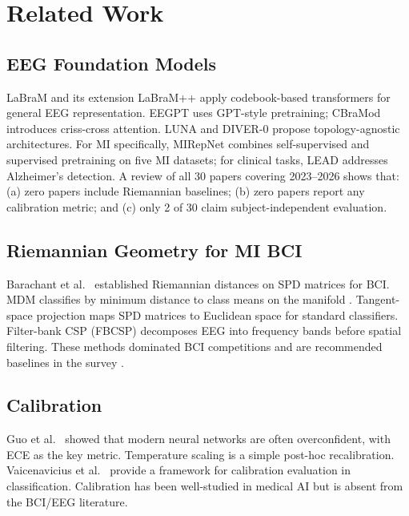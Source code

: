 \documentclass[conference]{IEEEtran}
\begin{document}
\section{Related Work}
\label{sec:related}

\subsection{EEG Foundation Models}
LaBraM \cite{labram2024} and its extension LaBraM++ \cite{labramplusplus2025}
apply codebook-based transformers for general EEG representation. EEGPT
\cite{eegpt2024} uses GPT-style pretraining; CBraMod \cite{cbramod2025}
introduces criss-cross attention. LUNA \cite{luna2025} and DIVER-0
\cite{diver2025} propose topology-agnostic architectures. For MI specifically,
MIRepNet \cite{mireNet2025} combines self-supervised and supervised pretraining
on five MI datasets; for clinical tasks, LEAD \cite{lead2025} addresses
Alzheimer's detection. A review of all 30 papers covering 2023--2026 shows
that: (a) zero papers include Riemannian baselines; (b) zero papers report
any calibration metric; and (c) only 2 of 30 claim subject-independent evaluation.

\subsection{Riemannian Geometry for MI BCI}
Barachant et al.\ \cite{barachant2012multiclass} established Riemannian
distances on SPD matrices for BCI. MDM classifies by minimum distance to
class means on the manifold \cite{barachant2013riemannian}. Tangent-space
projection \cite{congedo2017riemannian} maps SPD matrices to Euclidean space
for standard classifiers. Filter-bank CSP (FBCSP) \cite{ang2008filter}
decomposes EEG into frequency bands before spatial filtering. These methods
dominated BCI competitions and are recommended baselines in the survey
\cite{lotte2018review}.

\subsection{Calibration}
Guo et al.\ \cite{guo2017calibration} showed that modern neural networks
are often overconfident, with ECE as the key metric. Temperature scaling
is a simple post-hoc recalibration. Vaicenavicius et al.\
\cite{vaicenavicius2019evaluating} provide a framework for calibration
evaluation in classification. Calibration has been well-studied in medical
AI but is absent from the BCI/EEG literature.
\end{document}
